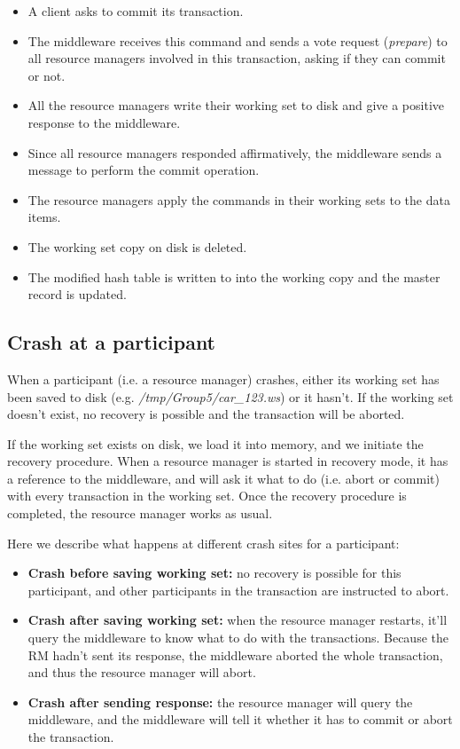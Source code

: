\documentclass[11pt]{article}
\begin{document}
\begin{itemize}
  \item A client asks to commit its transaction.
  \item The middleware receives this command and sends a vote request
    ({\it prepare}) to all resource managers involved in this
    transaction, asking if they can commit or not.
  \item All the resource managers write their working set to disk and
    give a positive response to the middleware.
  \item Since all resource managers responded affirmatively, the
    middleware sends a message to perform the commit operation.
  \item The resource managers apply the commands in their working sets
    to the data items.
  \item The working set copy on disk is deleted.
  \item The modified hash table is written to into the working copy
    and the master record is updated.
\end{itemize}

\subsection{Crash at a participant}

When a participant (i.e. a resource manager) crashes, either its
working set has been saved to disk (e.g. {\it /tmp/Group5/car\_123.ws})
or it hasn't.  If the working set doesn't exist, no recovery is
possible and the transaction will be aborted.

If the working set exists on disk, we load it into memory, and we
initiate the recovery procedure.  When a resource manager is started
in recovery mode, it has a reference to the middleware, and will ask
it what to do (i.e. abort or commit) with every transaction in the
working set.  Once the recovery procedure is completed, the resource
manager works as usual.

Here we describe what happens at different crash sites for a
participant:

\begin{itemize}
  \item {\bf Crash before saving working set:} no recovery is possible
    for this participant, and other participants in the transaction
    are instructed to abort.
  \item {\bf Crash after saving working set:} when the resource
    manager restarts, it'll query the middleware to know what to do
    with the transactions.  Because the RM hadn't sent its response,
    the middleware aborted the whole transaction, and thus the
    resource manager will abort.
  \item {\bf Crash after sending response:} the resource manager will
    query the middleware, and the middleware will tell it whether it
    has to commit or abort the transaction.
\end{itemize}
\end{document}
